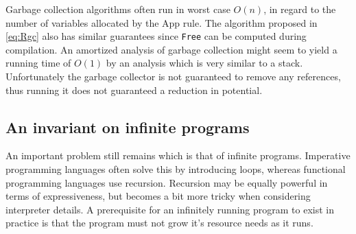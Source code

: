 \documentclass[11pt,oneside,a4paper]{report}
\begin{document}
Garbage collection algorithms often run in worst case $O(n)$, in regard to the number of variables allocated by the App rule.
The algorithm proposed in \autoref{eq:Rgc} also has similar guarantees since \texttt{Free} can be computed during compilation.
An amortized analysis of garbage collection might seem to yield a running time of $O(1)$ by an analysis which is very similar to a stack.
Unfortunately the garbage collector is not guaranteed to remove any references, thus running it does not guaranteed a reduction in potential.



\subsection{An invariant on infinite programs}\label{subsec:inf}
An important problem still remains which is that of infinite programs.
Imperative programming languages often solve this by introducing loops, whereas functional programming languages use recursion.
Recursion may be equally powerful in terms of expressiveness, but becomes a bit more tricky when considering interpreter details.
A prerequisite for an infinitely running program to exist in practice is that the program must not grow it's resource needs as it runs.
\end{document}
